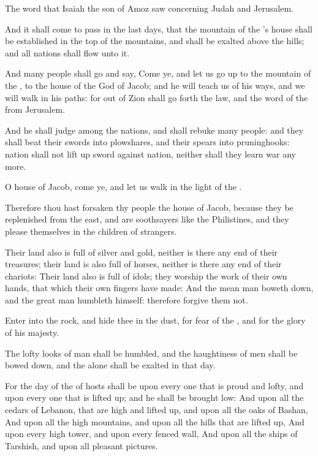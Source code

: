 \Chapter
\Verse The word that Isaiah the son of Amoz saw concerning Judah and Jerusalem.

\Verse And it shall come to pass in the last days, that the mountain of the \LORD's house shall be established in the top of the mountains, and shall be exalted above the hills; and all nations shall flow unto it.

\Verse And many people shall go and say, Come ye, and let us go up to the mountain of the \LORD, to the house of the God of Jacob; and he will teach us of his ways, and we will walk in his paths: for out of Zion shall go forth the law, and the word of the \LORD from Jerusalem.

\Verse And he shall judge among the nations, and shall rebuke many people: and they shall beat their swords into plowshares, and their spears into pruninghooks: nation shall not lift up sword against nation, neither shall they learn war any more.

\Verse O house of Jacob, come ye, and let us walk in the light of the \LORD.

\Verse Therefore thou hast forsaken thy people the house of Jacob, because they be replenished from the east, and are soothsayers like the Philistines, and they please themselves in the children of strangers.

\Verse Their land also is full of silver and gold, neither is there any end of their treasures; their land is also full of horses, neither is there any end of their chariots: \Verse Their land also is full of idols; they worship the work of their own hands, that which their own fingers have made: \Verse And the mean man boweth down, and the great man humbleth himself: therefore forgive them not.

\Verse Enter into the rock, and hide thee in the dust, for fear of the \LORD, and for the glory of his majesty.

\Verse The lofty looks of man shall be humbled, and the haughtiness of men shall be bowed down, and the \LORD alone shall be exalted in that day.

\Verse For the day of the \LORD of hosts shall be upon every one that is proud and lofty, and upon every one that is lifted up; and he shall be brought low: \Verse And upon all the cedars of Lebanon, that are high and lifted up, and upon all the oaks of Bashan, \Verse And upon all the high mountains, and upon all the hills that are lifted up, \Verse And upon every high tower, and upon every fenced wall, \Verse And upon all the ships of Tarshish, and upon all pleasant pictures.

